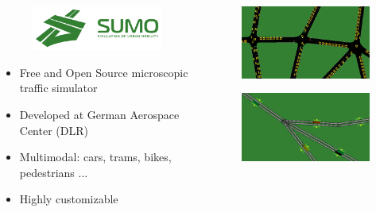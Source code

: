 \documentclass[dvipsnames]{beamer}
\begin{document}
\begin{frame}
  \begin{columns}
    \begin{column}{0.4\textwidth}
      \begin{figure}
        \centering
        \includegraphics[width=1.0\textwidth]{figures/sumo-logo.png}
      \end{figure}
      \begin{itemize}
        \item Free and Open Source microscopic traffic simulator
        \item Developed at German Aerospace Center (DLR)
        \item Multimodal: cars, trams, bikes, pedestrians ...
        \item Highly customizable
      \end{itemize}
    \end{column}
    \begin{column}{0.6\textwidth}
      \begin{figure}
        \centering
        \includegraphics[width=1.0\textwidth]{figures/sumo-example.png}
      \end{figure}
      \begin{figure}
        \centering
        \includegraphics[width=1.0\textwidth]{figures/sumo-example2.png}

\end{figure}
\end{column}
\end{columns}
\end{frame}
\end{document}
